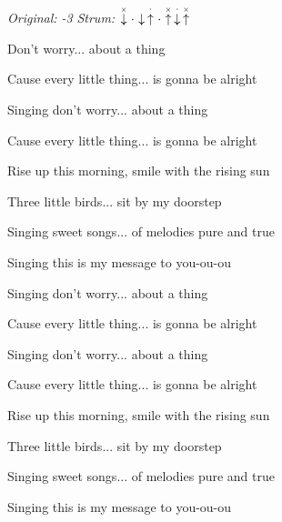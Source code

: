 \begin{song}


\begin{headerbox}
\textit{Original: -3} \quad
\textit{Strum:} $\ChuckDown\Miss\Down\StaccatoUp\Miss\ChuckUp\StaccatoDown\ChuckUp$
\end{headerbox}

\begin{chordbox}
\end{chordbox}

\Large

\bigskip

Don't worry... about a thing \par
Cause every little thing... is gonna be alright \par
Singing don't worry... about a thing \par
Cause every little thing... is gonna be alright \par

\bigskip

Rise up this morning, smile with the rising sun \par
Three little birds... sit by my doorstep \par
Singing sweet songs... of melodies pure and true \par
Singing  this is my message to you-ou-ou \par

\bigskip

Singing don't worry... about a thing \par
Cause every little thing... is gonna be alright \par
Singing don't worry... about a thing \par
Cause every little thing... is gonna be alright \par

\bigskip

Rise up this morning, smile with the rising sun \par
Three little birds... sit by my doorstep \par
Singing sweet songs... of melodies pure and true \par
Singing  this is my message to you-ou-ou \par


\end{song}
